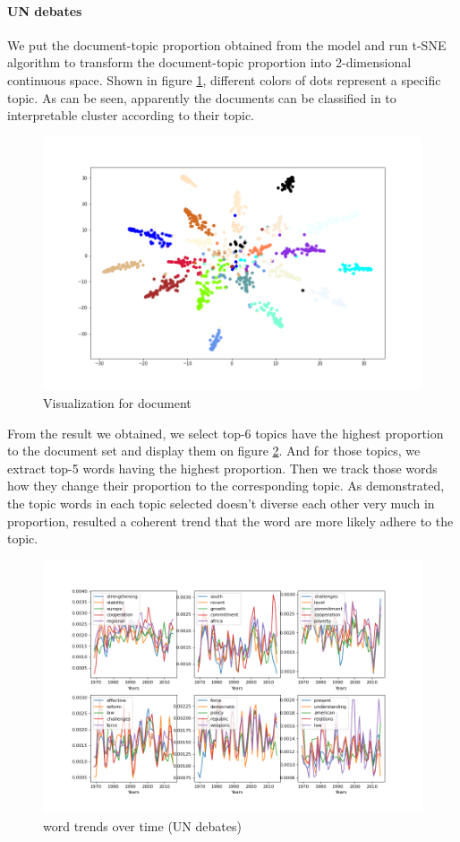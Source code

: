 \paragraph{UN debates}We put the document-topic proportion obtained from the model and run t-SNE algorithm to transform the document-topic proportion into 2-dimensional continuous space. Shown in figure \ref{fig:tsne1}, different colors of dots represent a specific topic. As can be seen, apparently the documents can be classified in to interpretable cluster according to their topic.\\
\begin{figure}[h]
\centering
\includegraphics[width=0.9\linewidth]{figures/1128/tsne1}
\caption{Visualization for document}
\label{fig:tsne1}
\end{figure}
From the result we obtained, we select top-6 topics have the highest proportion to the document set and display them on figure \ref{fig:scatter}. And for those topics, we extract top-5 words having the highest proportion. Then we track those words how they change their proportion to the corresponding topic. As demonstrated, the topic words in each topic selected doesn't diverse each other very much in proportion, resulted a coherent trend that the word are more likely adhere to the topic.\\
\begin{figure}[h]
\centering
\includegraphics[width=0.9\linewidth]{figures/1128/scatter}
\caption{word trends over time (UN debates)}
\label{fig:scatter}
\end{figure}
